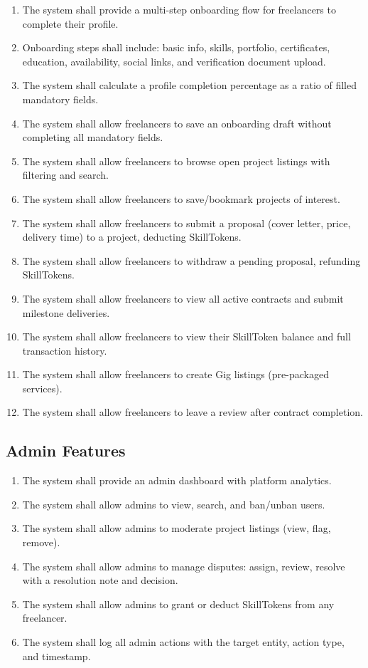 \begin{enumerate}[label=FR-FRLNC-\arabic*]
  \item The system shall provide a multi-step onboarding flow for freelancers to complete their profile.
  \item Onboarding steps shall include: basic info, skills, portfolio, certificates, education, availability, social links, and verification document upload.
  \item The system shall calculate a profile completion percentage as a ratio of filled mandatory fields.
  \item The system shall allow freelancers to save an onboarding draft without completing all mandatory fields.
  \item The system shall allow freelancers to browse open project listings with filtering and search.
  \item The system shall allow freelancers to save/bookmark projects of interest.
  \item The system shall allow freelancers to submit a proposal (cover letter, price, delivery time) to a project, deducting SkillTokens.
  \item The system shall allow freelancers to withdraw a pending proposal, refunding SkillTokens.
  \item The system shall allow freelancers to view all active contracts and submit milestone deliveries.
  \item The system shall allow freelancers to view their SkillToken balance and full transaction history.
  \item The system shall allow freelancers to create Gig listings (pre-packaged services).
  \item The system shall allow freelancers to leave a review after contract completion.
\end{enumerate}

\subsection{Admin Features}

\begin{enumerate}[label=FR-ADMIN-\arabic*]
  \item The system shall provide an admin dashboard with platform analytics.
  \item The system shall allow admins to view, search, and ban/unban users.
  \item The system shall allow admins to moderate project listings (view, flag, remove).
  \item The system shall allow admins to manage disputes: assign, review, resolve with a resolution note and decision.
  \item The system shall allow admins to grant or deduct SkillTokens from any freelancer.
  \item The system shall log all admin actions with the target entity, action type, and timestamp.
\end{enumerate}

